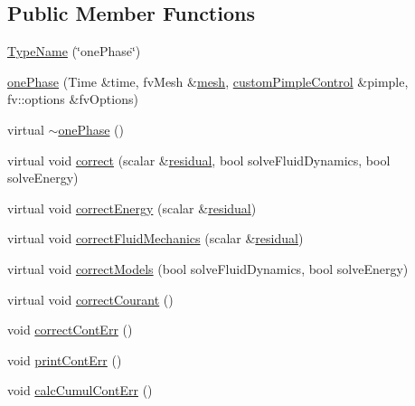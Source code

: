 \subsection*{Public Member Functions}
\begin{DoxyCompactItemize}
\item 
\hyperlink{classFoam_1_1thermalHydraulicsModels_1_1onePhase_a469b6596fc46e154b828ecbfd6cb094e}{Type\+Name} (\char`\"{}one\+Phase\char`\"{})
\item 
\hyperlink{classFoam_1_1thermalHydraulicsModels_1_1onePhase_a46ec494eb3b75dbf1a1abc5c316803da}{one\+Phase} (Time \&time, fv\+Mesh \&\hyperlink{createMeshesPostProcess_8H_a8bb1e58291d2d2b653e024a4f4bffe38}{mesh}, \hyperlink{classFoam_1_1customPimpleControl}{custom\+Pimple\+Control} \&pimple, fv\+::options \&fv\+Options)
\item 
virtual \hyperlink{classFoam_1_1thermalHydraulicsModels_1_1onePhase_a9a1fa39626e6bb14d54ed4b995d17e03}{$\sim$one\+Phase} ()
\item 
virtual void \hyperlink{classFoam_1_1thermalHydraulicsModels_1_1onePhase_ace6b3314b058f5c94eb96f99a1f4784d}{correct} (scalar \&\hyperlink{solveThermalMechanics_8H_a840cf6bbf9aacf15bd364b478394c3a7}{residual}, bool solve\+Fluid\+Dynamics, bool solve\+Energy)
\item 
virtual void \hyperlink{classFoam_1_1thermalHydraulicsModels_1_1onePhase_ad7a94cfeb7bfe17f10cb2a3782e1e896}{correct\+Energy} (scalar \&\hyperlink{solveThermalMechanics_8H_a840cf6bbf9aacf15bd364b478394c3a7}{residual})
\item 
virtual void \hyperlink{classFoam_1_1thermalHydraulicsModels_1_1onePhase_adfb5aa92b87e35ceaf380442a10e1094}{correct\+Fluid\+Mechanics} (scalar \&\hyperlink{solveThermalMechanics_8H_a840cf6bbf9aacf15bd364b478394c3a7}{residual})
\item 
virtual void \hyperlink{classFoam_1_1thermalHydraulicsModels_1_1onePhase_ab339c59ef518e68e6ba82997b9d06454}{correct\+Models} (bool solve\+Fluid\+Dynamics, bool solve\+Energy)
\item 
virtual void \hyperlink{classFoam_1_1thermalHydraulicsModels_1_1onePhase_a9e1998999bc6cfc318ce37ca9499742e}{correct\+Courant} ()
\item 
void \hyperlink{classFoam_1_1thermalHydraulicsModels_1_1onePhase_acf57719bd1e87c69f632508ce2a90930}{correct\+Cont\+Err} ()
\item 
void \hyperlink{classFoam_1_1thermalHydraulicsModels_1_1onePhase_aa4253ac99a025afc6c108e59d7f42184}{print\+Cont\+Err} ()
\item 
void \hyperlink{classFoam_1_1thermalHydraulicsModels_1_1onePhase_a416eeefe4b59f1124821c6b6ecfb5a7e}{calc\+Cumul\+Cont\+Err} ()
\end{DoxyCompactItemize}
